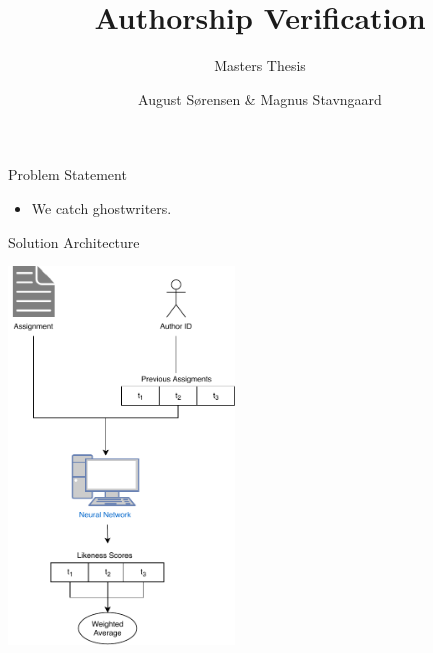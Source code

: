 \documentclass[10pt]{beamer}
\title{Authorship Verification}
\subtitle{Masters Thesis}
\date{}
\author{August S\o rensen \& Magnus Stavngaard}
\institute{University of Copenhagen}
\begin{document}
\maketitle

\begin{frame}[fragile]{Problem Statement}
    \begin{itemize}
        \item We catch ghostwriters.
    \end{itemize}
\end{frame}

\begin{frame}[fragile]{Solution Architecture}
    \begin{center}
        \includegraphics[width=0.45\textwidth]{../../macom/summary/pictures/Model}
    \end{center}
\end{frame}
\end{document}
